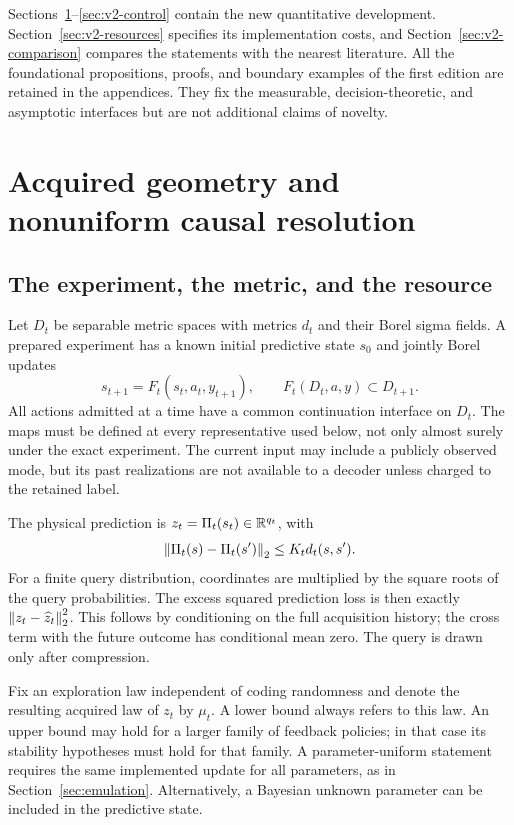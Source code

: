 Sections~\ref{sec:v2-resolution}--\ref{sec:v2-control} contain the new
quantitative development. Section~\ref{sec:v2-resources} specifies its
implementation costs, and Section~\ref{sec:v2-comparison} compares the
statements with the nearest literature. All the foundational propositions,
proofs, and boundary examples of the first edition are retained in the
appendices. They fix the measurable, decision-theoretic, and asymptotic
interfaces but are not additional claims of novelty.

\section{Acquired geometry and nonuniform causal resolution}
\label{sec:v2-resolution}
\subsection{The experiment, the metric, and the resource}
Let $D_t$ be separable metric spaces with metrics $d_t$ and their Borel
sigma fields. A prepared experiment has a known initial predictive state
$s_0$ and jointly Borel updates
\[
 s_{t+1}=F_t(s_t,a_t,y_{t+1}),\qquad
 F_t(D_t,a,y)\subset D_{t+1}.
\]
All actions admitted at a time have a common continuation interface on
$D_t$. The maps must be defined at every representative used below, not
only almost surely under the exact experiment. The current input may
include a publicly observed mode, but its past realizations are not
available to a decoder unless charged to the retained label.

The physical prediction is $z_t=\Pi_t(s_t)\in\mathbb R^{q_t}$, with
\[
 \left\lVert \Pi_t(s)-\Pi_t(s')\right\rVert_2\le K_t d_t(s,s').
\]
For a finite query distribution, coordinates are multiplied by the square
roots of the query probabilities. The excess squared prediction loss is
then exactly $\left\lVert z_t-\widehat z_t\right\rVert_2^2$. This follows by conditioning
on the full acquisition history; the cross term with the future outcome
has conditional mean zero. The query is drawn only after compression.

Fix an exploration law independent of coding randomness and denote the
resulting acquired law of $z_t$ by $\mu_t$. A lower bound always refers to
this law. An upper bound may hold for a larger family of feedback policies;
in that case its stability hypotheses must hold for that family. A
parameter-uniform statement requires the same implemented update for all
parameters, as in Section~\ref{sec:emulation}. Alternatively, a Bayesian
unknown parameter can be included in the predictive state.

